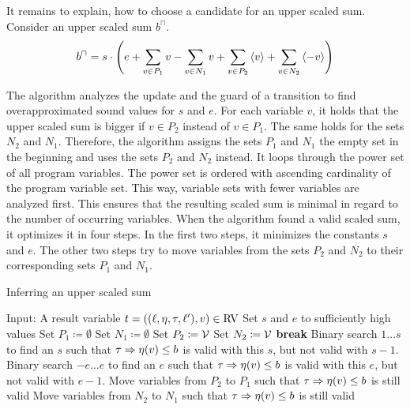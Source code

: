 It remains to explain, how to choose a candidate for an upper scaled sum.
Consider an upper scaled sum $b^\sqcap$.
\[ b^\sqcap = s \cdot \left(
e
+ \sum_{v \in P_1} v
- \sum_{v \in N_1} v
+ \sum_{v \in P_2} \left\langle v \right\rangle
+ \sum_{v \in N_2} \left\langle -v \right\rangle
\right)
\]

The algorithm analyzes the update and the guard of a transition to find overapproximated sound values for $s$ and $e$.
For each variable $v$, it holds that the upper scaled sum is bigger if $v \in P_2$ instead of $v \in P_1$.
The same holds for the sets $N_2$ and $N_1$.
Therefore, the algorithm assigns the sets $P_1$ and $N_1$ the empty set in the beginning and uses the sets $P_2$ and $N_2$ instead. 
It loops through the power set of all program variables.
The power set is ordered with ascending cardinality of the program variable set.
This way, variable sets with fewer variables are analyzed first.
This ensures that the resulting scaled sum is minimal in regard to the number of occurring variables.
When the algorithm found a valid scaled sum, it optimizes it in four steps.
In the first two steps, it minimizes the constants $s$ and $e$.
The other two steps try to move variables from the sets $P_2$ and $N_2$ to their corresponding sets $P_1$ and $N_1$.

\begin{algorithm}
\caption{Inferring an upper scaled sum}\label{ulsb_algorithm}
\begin{algorithmic}[1]
  \State Input: A result variable $t = ((\ell,\eta,\tau,\ell'),v) \in \text{RV}$
  \State Set $s$ and $e$ to sufficiently high values
  \State Set $P_1 \coloneqq \emptyset$
  \State Set $N_1 \coloneqq \emptyset$
    \State Set $P_2 \coloneqq \mathcal{V}$
    \State Set $N_2 \coloneqq \mathcal{V}$
      \State \textbf{break}
    \EndIf
  \EndFor
  \State Binary search $1 \dots s$ to find an $s$ such that $\tau \Rightarrow \eta(v) \leq b$ is valid with this $s$, but not valid with $s-1$.
  \State Binary search $-e \dots e$ to find an $e$ such that $\tau \Rightarrow \eta(v) \leq b$ is valid with this $e$, but not valid with $e-1$.
  \State Move variables from $P_2$ to $P_1$ such that $\tau \Rightarrow \eta(v) \leq b$ is still valid
  \State Move variables from $N_2$ to $N_1$ such that $\tau \Rightarrow \eta(v) \leq b$ is still valid
\end{algorithmic}
\end{algorithm}
